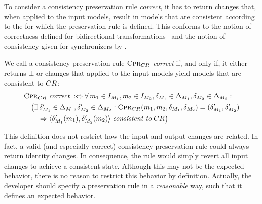 To consider a consistency preservation rule \emph{correct}, it has to return changes that, when applied to the input models, result in models that are consistent according to the \modellevelconsistencyrelation for which the preservation rule is defined.
This conforms to the notion of correctness defined for bidirectional transformations~\cite{stevens2010sosym} and the notion of consistency given for synchronizers by \textcite{xiong2013SynchronizingConcurrentUpdates-SoSym}.

\begin{definition}
    \label{def:consistencypreservationrulecorrectness}
    We call a consistency preservation rule $\consistencypreservationrule{\consistencyrelation{CR}{}}$ \emph{correct} if, and only if, it either returns $\bot$ or changes that applied to the input models yield models that are consistent to $\consistencyrelation{CR}{}$:
    \begin{align*} &
        \consistencypreservationrule{\consistencyrelation{CR}{}} \correctmath \equivalentperdefinition
        \forall 
        \model{m}{1} \in \metamodelinstanceset{M}{1}, 
        \model{m}{2} \in \metamodelinstanceset{M}{2},
        \change{\metamodel{M}{1}} \in \changeuniverse{\metamodel{M}{1}},
        \change{\metamodel{M}{2}} \in \changeuniverse{\metamodel{M}{2}} : \\
        & \formulaskip
        \bigl( \exists 
        \change{\metamodel{M}{1}}' \in \changeuniverse{\metamodel{M}{1}},
        \change{\metamodel{M}{2}}' \in \changeuniverse{\metamodel{M}{2}} :
        \consistencypreservationrule{\consistencyrelation{CR}{}}(\model{m}{1}, \model{m}{2}, \change{\metamodel{M}{1}}, \change{\metamodel{M}{2}}) = (\change{\metamodel{M}{1}}', \change{\metamodel{M}{2}}') \\
        & \formulaskip\formulaskip
        \Rightarrow
        \tupled{\change{\metamodel{M}{1}}'(\model{m}{1}), \change{\metamodel{M}{2}}'(\model{m}{2})} \consistenttomath \consistencyrelation{CR}{} \bigr)
    \end{align*}
\end{definition}

This definition does not restrict how the input and output changes are related.
In fact, a valid (and especially correct) consistency preservation rule could always return identity changes.
In consequence, the rule would simply revert all input changes to achieve a consistent state.
Although this may not be the expected behavior, there is no reason to restrict this behavior by definition.
Actually, the developer should specify a preservation rule in a \emph{reasonable} way, such that it defines an expected behavior.

